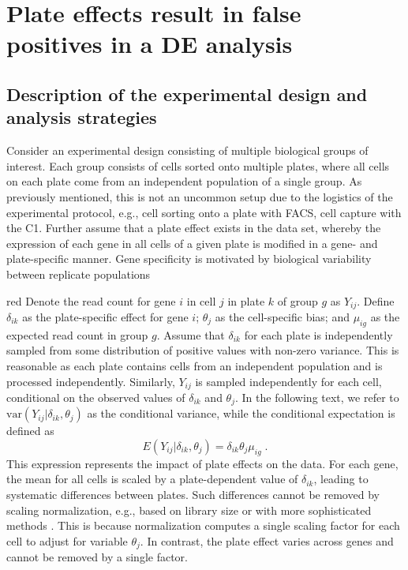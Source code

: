 \documentclass[oupdraft]{bio}
\begin{document}
\section{Plate effects result in false positives in a DE analysis}

\subsection{Description of the experimental design and analysis strategies}
Consider an experimental design consisting of multiple biological groups of interest.
Each group consists of cells sorted onto multiple plates, where all cells on each plate come from an independent population of a single group.
As previously mentioned, this is not an uncommon setup due to the logistics of the experimental protocol, e.g., cell sorting onto a plate with FACS, cell capture with the C1.
Further assume that a plate effect exists in the data set, whereby the expression of each gene in all cells of a given plate is modified in a gene- and plate-specific manner.
Gene specificity is motivated by biological variability between replicate populations

\begin{color}{red}
Denote the read count for gene $i$ in cell $j$ in plate $k$ of group $g$ as $Y_{ij}$.
Define $\delta_{ik}$ as the plate-specific effect for gene $i$; $\theta_j$ as the cell-specific bias; and $\mu_{ig}$ as the expected read count in group $g$.
Assume that $\delta_{ik}$ for each plate is independently sampled from some distribution of positive values with non-zero variance.
This is reasonable as each plate contains cells from an independent population and is processed independently.
Similarly, $Y_{ij}$ is sampled independently for each cell, conditional on the observed values of $\delta_{ik}$ and $\theta_j$.
In the following text, we refer to $\mbox{var}(Y_{ij}|\delta_{ik},\theta_j)$ as the conditional variance, while the conditional expectation is defined as
\[
    E(Y_{ij}|\delta_{ik},\theta_j) = \delta_{ik}\theta_j\mu_{ig} \;.
\]
This expression represents the impact of plate effects on the data.
For each gene, the mean for all cells is scaled by a plate-dependent value of $\delta_{ik}$, leading to systematic differences between plates.
Such differences cannot be removed by scaling normalization, e.g., based on library size or with more sophisticated methods \citep{anders2010differential,robinson2010scaling}.
This is because normalization computes a single scaling factor for each cell to adjust for variable $\theta_j$.
In contrast, the plate effect varies across genes and cannot be removed by a single factor.
\end{color}
\end{document}
